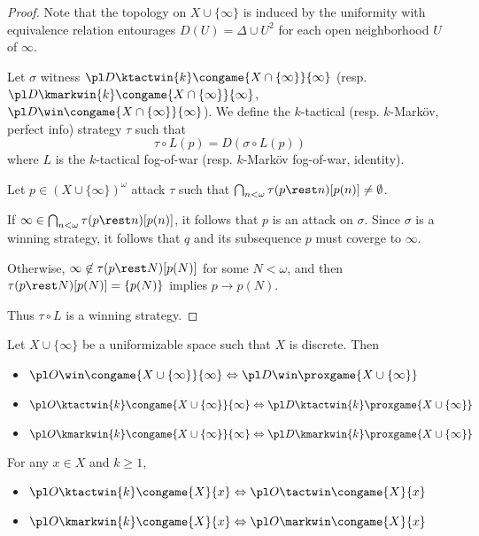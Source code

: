 \begin{proof}
  Note that the topology on $X\cup\{\infty\}$ is induced by the uniformity with equivalence relation entourages $D(U)=\Delta\cup U^2$ for each open neighborhood $U$ of $\infty$.

  Let $\sigma$ witness $\pl D \ktactwin{k}\congame{X\cap\{\infty\}}{\infty}$ (resp. $\pl D \kmarkwin{k}\congame{X\cap\{\infty\}}{\infty}$, $\pl D\win\congame{X\cap\{\infty\}}{\infty}$). We define the $k$-tactical (resp. $k$-Mark\"ov, perfect info) strategy $\tau$ such that
    \[
      \tau\circ L(p)
        =
      D(\sigma\circ L(p))
    \]
  where $L$ is the $k$-tactical fog-of-war (resp. $k$-Mark\"ov fog-of-war, identity).

  Let $p\in (X\cup\{\infty\})^\omega$ attack $\tau$ such that $\bigcap_{n<\omega}\tau(p\rest n)[p(n)]\not=\emptyset$.

  If $\infty\in\bigcap_{n<\omega}\tau(p\rest n)[p(n)]$, it follows that $p$ is an attack on $\sigma$. Since $\sigma$ is a winning strategy, it follows that $q$ and its subsequence $p$ must coverge to $\infty$.

  Otherwise, $\infty\not\in\tau(p\rest N)[p(N)]$ for some $N<\omega$, and then $\tau(p\rest N)[p(N)]=\{p(N)\}$ implies $p\to p(N)$.

  Thus $\tau\circ L$ is a winning strategy.
\end{proof}

\begin{cor}
  Let $X\cup\{\infty\}$ be a uniformizable space such that $X$ is discrete. Then
  \begin{itemize}
    \item
      $\pl O\win \congame{X\cup\{\infty\}}{\infty} \Leftrightarrow \pl D \win \proxgame{X\cup\{\infty\}}$
    \item
      $\pl O\ktactwin{k} \congame{X\cup\{\infty\}}{\infty} \Leftrightarrow \pl D \ktactwin{k} \proxgame{X\cup\{\infty\}}$
    \item
      $\pl O\kmarkwin{k} \congame{X\cup\{\infty\}}{\infty} \Leftrightarrow \pl D \kmarkwin{k} \proxgame{X\cup\{\infty\}}$
  \end{itemize}
\end{cor}

\begin{prop} For any $x\in X$ and $k\geq 1$,
  \begin{itemize}
    \item
      $\pl O\ktactwin{k}\congame{X}{x} \Leftrightarrow \pl O\tactwin\congame{X}{x}$
    \item
      $\pl O\kmarkwin{k}\congame{X}{x} \Leftrightarrow \pl O\markwin\congame{X}{x}$
  \end{itemize}
\end{prop}

